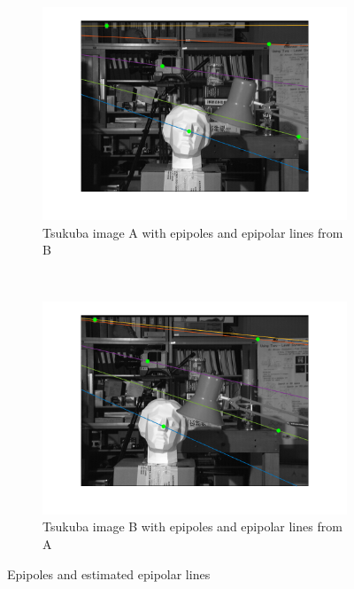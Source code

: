 \documentclass[a4paper, 10pt, conference]{ieeeconf}
\begin{document}
\begin{figure}[!ht]
  \captionsetup[subfigure]{position=b}
  \centering
    \begin{subfigure}{0.45\linewidth}
      \includegraphics[width=\textwidth]{pic/q1_3_d_A}
      \caption{Tsukuba image A with epipoles and epipolar lines from B}
      \label{fig:tsuka}
    \end{subfigure}
    ~
    \begin{subfigure}{0.45\linewidth}
      \includegraphics[width=\textwidth]{pic/q1_3_d_B}
      \caption{Tsukuba image B with epipoles and epipolar lines from A}
      \label{fig:tsukb}
    \end{subfigure}

	\caption{Epipoles and estimated epipolar lines}
  \label{fig:epipolar}
\end{figure}
\end{document}
